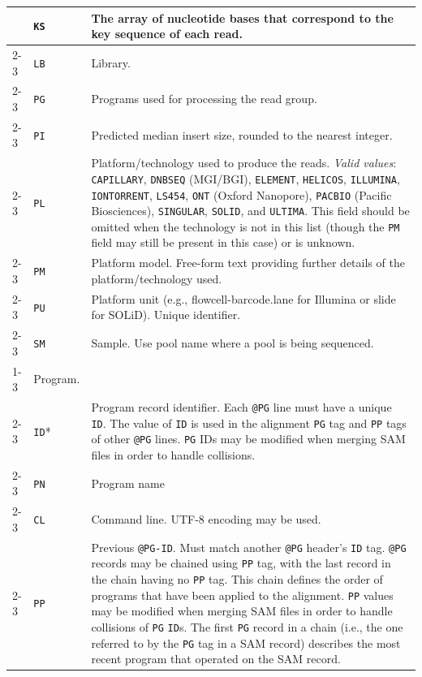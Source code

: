 \documentclass[10pt]{article}
\begin{document}
\begin{center}
\begin{longtable}{|l|l|p{13.5cm}|}
  & {\tt KS} & The array of nucleotide bases that correspond to the key sequence of each read.\\\cline{2-3}
  & {\tt LB} & Library.\\\cline{2-3}
  & {\tt PG} & Programs used for processing the read group.\\\cline{2-3}
  & {\tt PI} & Predicted median insert size, rounded to the nearest integer.\\\cline{2-3}
  & {\tt PL} & Platform/technology used to produce the reads. \emph{Valid values}:
  {\tt CAPILLARY}, {\tt DNBSEQ} (MGI/BGI), {\tt ELEMENT}, {\tt HELICOS}, {\tt ILLUMINA}, {\tt IONTORRENT}, {\tt LS454}, {\tt ONT} (Oxford Nanopore), {\tt PACBIO} (Pacific Biosciences), {\tt SINGULAR}, {\tt SOLID}, and {\tt ULTIMA}.
  This field should be omitted when the technology is not in this list (though the {\tt PM} field may still be present in this case) or is unknown.\\\cline{2-3}
  & {\tt PM} & Platform model. Free-form text providing further details of the platform/technology used.\\\cline{2-3}
  & {\tt PU} & Platform unit (e.g., flowcell-barcode.lane for Illumina or slide for SOLiD). Unique identifier.\\\cline{2-3}
  & {\tt SM} & Sample. Use pool name where a pool is being sequenced.\\\cline{1-3}
  \multicolumn{2}{|l}{\tt @PG} & Program. \\\cline{2-3}
  & {\tt ID}* & Program record identifier. Each {\tt @PG} line must have a unique {\tt ID}.
  	The value of {\tt ID} is used in the alignment {\tt PG} tag and {\tt PP} tags of other {\tt @PG} lines.
	{\tt PG} IDs may be modified when merging SAM files in order to handle collisions.\\\cline{2-3}
  & {\tt PN} & Program name \\\cline{2-3}
  & {\tt CL} & Command line.  UTF-8 encoding may be used. \\\cline{2-3}
  & {\tt PP} & Previous {\tt @PG-ID}. Must match another {\tt @PG} header's {\tt ID} tag.
  	{\tt @PG} records may be chained using {\tt PP} tag, with the last record in the chain
	having no {\tt PP} tag. This chain defines the order of programs that have been applied to the alignment.
	{\tt PP} values may be modified when merging SAM files in order to handle collisions of {\tt PG} {\tt ID}s.
	The first {\tt PG} record in a chain (i.e., the one referred to by the {\tt PG} tag in a SAM record)
	describes the most recent program that operated on the SAM record.

\end{longtable}
\end{center}
\end{document}
